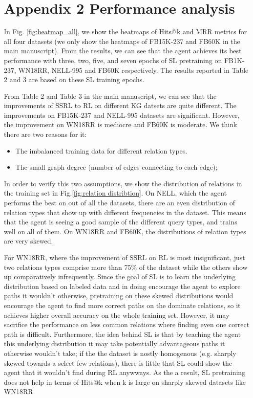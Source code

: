 \documentclass[letterpaper]{article} %
\begin{document}
\section{Appendix 2 Performance analysis}
\label{sec:appendix}
In Fig. \ref{fig:heatmap_all}, we show the heatmaps of Hits@k and MRR metrics for all four datasets (we only show the heatmaps of FB15K-237 and FB60K in the main manuscript). From the results, we can see that the agent achieves its best performance with three, two, five, and seven epochs of SL pretraining on FB1K-237, WN18RR, NELL-995 and FB60K respectively. The results reported in Table 2 and 3 are based on these SL training epochs. 



From Table 2 and Table 3 in the main manuscript, we can see that the improvements of SSRL to RL on different KG datsets are quite different. The improvements on FB15K-237 and NELL-995 datasets are significant. However, the improvement on WN18RR is mediocre and FB60K is moderate. We think there are two reasons for it: 
\begin{itemize}
    \item The imbalanced training data for different relation types.
    \item The small graph degree (number of edges connecting to each edge);
\end{itemize}


In order to verify this two assumptions, we show the distribution of relations in the training set in Fig.\ref{fig:relation distribtion}. On NELL, which the agent performs the best on out of all the datasets, there are an even distribution of relation types that show up with different frequencies in the dataset. This means that the agent is seeing a good sample of the different query types, and trains well on all of them. On WN18RR and FB60K, the distributions of relation types are very skewed. 

For WN18RR, where the improvement of SSRL on RL is most insignificant, just two relations types comprise more than 75\% of the dataset while the others show up comparatively infrequently. Since the goal of SL is to learn the underlying distribution based on labeled data and in doing encourage the agent to explore paths it wouldn't otherwise, pretraining on these skewed distributions would encourage the agent to find more correct paths on the dominate relations, so it achieves higher overall accuracy on the whole training set. However, it may sacrifice the performance on less common relations where finding even one correct path is difficult. Furthermore, the idea behind SL is that by teaching the agent this underlying distribution it may take potentially advantageous paths it otherwise wouldn't take; if the the dataset is nostly homogenous (e.g. sharply skewed towards a select few relations), there is little that SL could show the agent that it wouldn't find during RL anywways. As the a result, SL pretraining does not help in terms of Hits@k when k is large on sharply skewed datasets like WN18RR 
\end{document}
